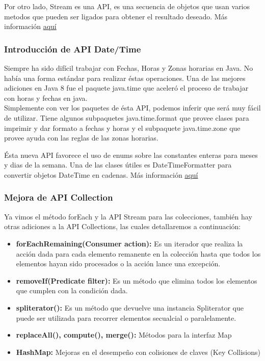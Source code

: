 \documentclass[12pt,article,oneside]{memoir}
\begin{document}
				Por otro lado, Stream es una API, es una secuencia de objetos que usan varios metodos que pueden ser ligados 
				para obtener el resultado deseado. M\'as informaci\'on \href{https://www.geeksforgeeks.org/difference-between-streams-and-collections-in-java/}{aqu\'i}\\
				
				\subsubsection{Introducci\'on de API Date/Time}
				
				Siempre ha sido dif\'icil trabajar con Fechas, Horas y Zonas horarias en Java. No hab\'ia una forma est\'andar 
				para realizar \'estas operaciones. Una de las mejores adiciones en Java 8 fue el paquete java.time que aceler\'o 
				el proceso de trabajar con horas y fechas en java.\\
				
				Simplemente con ver los paquetes de \'esta API, podemos inferir que ser\'a muy f\'acil de utilizar. Tiene algunos 
				subpaquetes java.time.format que provee clases para imprimir y dar formato a fechas y horas y el subpaquete 
				java.time.zone que provee ayuda con las reglas de las zonas horarias.
				
				\'Esta nueva API favorece el uso de enums sobre las constantes enteras para meses y dias de la semana. Una de 
				las clases \'utiles es DateTimeFormatter para convertir objetos DateTime	en cadenas. M\'as informaci\'on 
				\href{https://www.digitalocean.com/community/tutorials/java-8-date-localdate-localdatetime-instant}{aqu\'i}\\
				
				\subsubsection{Mejora de API Collection}
				
				Ya vimos el m\'etodo forEach y la API Stream para las colecciones, tambi\'en hay otras adiciones a la API 
				Collections, las cuales detallaremos a continuaci\'on:\\
				\begin{itemize}
					\item \textbf{forEachRemaining(Consumer action):} Es un iterador que realiza la acci\'on dada para cada 
					elemento remanente en la colecci\'on hasta que todos los elementos hayan sido procesados o la acci\'on lance 
					una excepci\'on.
					\item \textbf{removeIf(Predicate filter):} Es un m\'etodo que elimina todos los elementos que cumplen con la 
					condici\'on dada.
					\item \textbf{spliterator():} Es un m\'etodo que devuelve una instancia Spliterator que puede ser utilizada 
					para recorrer elementos secualcial o paralelamente.
					\item \textbf{replaceAll(), compute(), merge():} M\'etodos para la interfaz Map
					\item \textbf{HashMap:} Mejoras en el desempe\~no con colisiones de claves (Key Collisions)
				\end{itemize}
				
\end{document}
